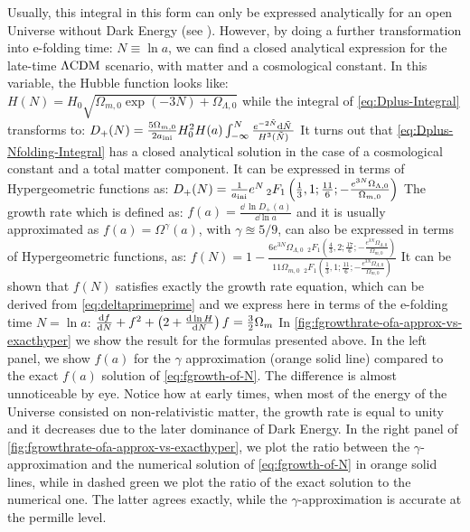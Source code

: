 Usually, this integral in this form can only be expressed analytically for
an open Universe without Dark Energy (see ).
However, by doing a further transformation into e-folding time: $ N \equiv \ln a$,
we can find a closed analytical expression
for the late-time $\Lambda\mathrm{CDM}$ scenario, with matter and a cosmological constant.
In this variable, the Hubble function looks like:
\beeqc$
H(N) = H_0 \sqrt{\Omega_{m,0} \exp{(-3 N)} + \Omega_{\Lambda,0} }
$
while the integral of \cref{eq:Dplus-Integral} transforms to:
\beeqp$\label{eq:Dplus-Nfolding-Integral}
D_{+}(N)  = \frac{5 \Omega_{m,0}}{2 a_{\rm ini}} H_0^2 H(a) \int_{-\infty}^{N} 
\frac{e^{-2 \tilde N} \mathrm{d} {\tilde{N}} \,}{ H^3(\tilde N)}
$
It turns out that \cref{eq:Dplus-Nfolding-Integral} has a closed analytical
solution in the case of a cosmological constant and a total matter component.
It can be expressed in terms of Hypergeometric functions as:
\beeqp$\label{eq:Dplus-Hyper}
D_{+}(N) = \frac{1}{a_{\rm ini}} e^{N} \, _2F_1\left(\frac{1}{3},1;\frac{11}{6};-\frac{e^{3 N} \Omega_{\Lambda,0}}{ \Omega_{m,0} } \right)
$
The growth rate which is defined as:
\beeqc$
f(a) = \frac{\dd{\,\ln} D_{+}(a)}{\dd \ln a} 
$
and it is usually approximated as $f(a)=\Omega^\gamma (a)$,
with $\gamma \approxeq 5/9$, 
can also be expressed in terms of Hypergeometric functions, as:
\beeqp$\label{eq:fgrowth-of-N}
f(N) = 1-\frac{6 e^{3 N} \Omega _{\Lambda ,0} \,\; _2F_1\left(\frac{4}{3},2;\frac{17}{6};-\frac{e^{3 N} \Omega _{\Lambda ,0}}{\Omega _{m,0}}\right)}{11 \Omega _{m,0} \;\, _2F_1\left(\frac{1}{3},1;\frac{11}{6};-\frac{e^{3 N} \Omega_{\Lambda ,0}}{\Omega _{m,0}}\right)}
$
It can be shown that $f(N)$ satisfies exactly the growth rate equation, which can be derived
from \cref{eq:deltaprimeprime} and we express here in terms of the e-folding time
$N = \ln a$:
\beeqp$\label{eq:f-of-N-diffeq}
 \frac{\mathrm{d} {f} }{\mathrm{d} {N}} + f^2 + \left( 2 + \frac{\mathrm{d} {\,\ln H} }{\mathrm{d} {N}} \right) f = \frac{3}{2} \Omega_m
$
In \cref{fig:fgrowthrate-ofa-approx-vs-exacthyper} we show the result
for the formulas presented above. In the left panel,
we show $f(a)$ for the $\gamma$ approximation (orange solid line) compared
to the exact $f(a)$ solution of \cref{eq:fgrowth-of-N}. The difference is almost unnoticeable
by eye. Notice how at early times, when most of the energy of the Universe
consisted on non-relativistic matter, the growth rate is equal to unity and it 
decreases due to the later dominance of Dark Energy.
In the right panel of \cref{fig:fgrowthrate-ofa-approx-vs-exacthyper},
we plot the ratio between the $\gamma$-approximation and the numerical solution
of \cref{eq:fgrowth-of-N} in orange solid lines,
while in dashed green we plot the ratio of the exact solution to the numerical one.
The latter agrees exactly, while the $\gamma$-approximation is accurate at the permille level.

